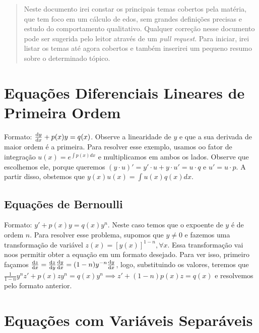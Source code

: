 \documentclass[12pt]{article}
\begin{document}
\maketitle

\begin{abstract}
    Neste documento irei constar os principais temas cobertos pela matéria,
    que tem foco em um cálculo de edos, sem grandes definições precisas e
    estudo do comportamento qualitativo. Qualquer correção nesse documento
    pode ser sugerida pelo leitor através de um \textit{pull request}. Para
    iniciar, irei listar os temas até agora cobertos e também inserirei um
    pequeno resumo sobre o determinado tópico. 
\end{abstract}

\tableofcontents

\section{Equações Diferenciais Lineares de Primeira Ordem}

Formato: $\dv{y}{x} + p(x)y = q(x)$. Observe a linearidade de $y$ e que a sua
derivada de maior ordem é a primeira. Para resolver esse exemplo, usamos oo
fator de integração $u(x) = e^{\int p(x) dx}$ e multiplicamos em ambos os
lados. Observe que escolhemos ele, porque queremos $(y\cdot u)' = y'\cdot u +
y\cdot u' = u\cdot q$ e $u' = u\cdot p$. A partir disso, obstemos que
$y(x)u(x) = \int u(x)q(x) dx$. 

\subsection{Equações de Bernoulli}

Formato: $y' + p(x)y = q(x)y^n$. Neste caso temos que o expoente de $y$ é de
ordem $n$. Para resolver esse problema, supomos que $y \neq 0$ e fazemos uma
transformação de variável $z(x) = [y(x)]^{1-n}, \forall x$. Essa transformação
vai noos permitir obter a equação em um formato desejado. Para ver isso,
primeiro façamos $\dv{z}{x} = \dv{z}{y}\dv{y}{x} =
(1-n)y^{-n}\dv{y}{x}$, logo, substituindo os valores, teremos que
$\frac{1}{1-n}y^{n}z' + p(x)zy^n = q(x)y^n \implies z' + (1-n)p(x)z = q(x)$ e
resolvemos pelo formato anterior. 

\section{Equações com Variáveis Separáveis}
\end{document}
